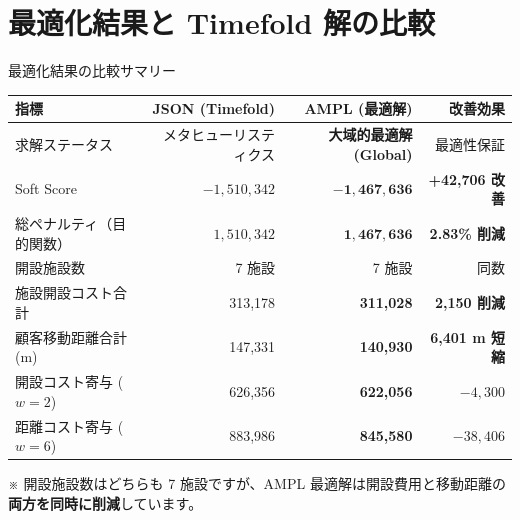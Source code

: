 \documentclass[aspectratio=169,11pt]{beamer}
\begin{document}
\section{最適化結果と Timefold 解の比較}

\begin{frame}{最適化結果の比較サマリー}
  \begin{table}\footnotesize
    \centering
    \setlength{\tabcolsep}{6pt}
    \begin{tabular}{lrrr}
      \toprule
      \textbf{指標} & \textbf{JSON (Timefold)} & \textbf{AMPL (最適解)} & \textbf{改善効果} \\
      \midrule
      求解ステータス & メタヒューリスティクス & \alert{\textbf{大域的最適解 (Global)}} & 最適性保証 \\
      Soft Score & $-1{,}510{,}342$ & $\mathbf{-1{,}467{,}636}$ & \alert{\textbf{+42,706 改善}} \\
      総ペナルティ（目的関数） & $1{,}510{,}342$ & $\mathbf{1{,}467{,}636}$ & \alert{\textbf{2.83\% 削減}} \\
      \midrule
      開設施設数 & 7 施設 & 7 施設 & 同数 \\
      施設開設コスト合計 & 313,178 & \textbf{311,028} & \textbf{2,150 削減} \\
      顧客移動距離合計 (m) & 147,331 & \textbf{140,930} & \textbf{6,401 m 短縮} \\
      \midrule
      開設コスト寄与 ($w=2$) & 626,356 & \textbf{622,056} & $-4,300$ \\
      距離コスト寄与 ($w=6$) & 883,986 & \textbf{845,580} & $-38,406$ \\
      \bottomrule
    \end{tabular}
  \end{table}
  \vspace{-0.6em}
  \scriptsize
  ※ 開設施設数はどちらも 7 施設ですが、AMPL 最適解は開設費用と移動距離の\alert{\textbf{両方を同時に削減}}しています。
\end{frame}
\end{document}
